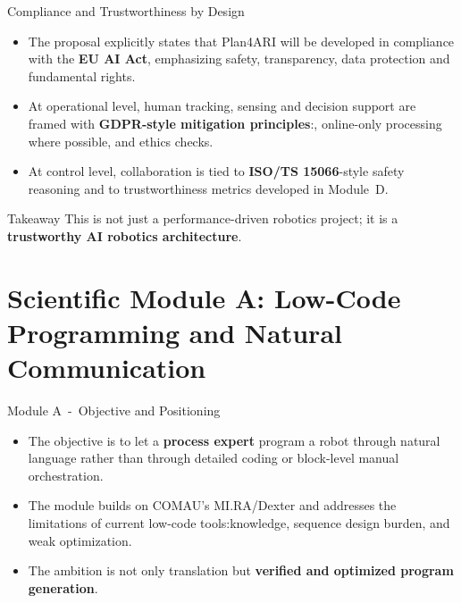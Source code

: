 \documentclass[aspectratio=169,10pt]{beamer}
\begin{document}
\begin{frame}{Compliance and Trustworthiness by Design}

\begin{itemize}
  \item The proposal explicitly states that Plan4ARI will be developed in compliance with the \textbf{EU AI Act}, emphasizing safety, transparency, data protection and fundamental rights.
  \item At operational level, human tracking, sensing and decision support are framed with \textbf{GDPR-style mitigation principles}:\@anonymization, online-only processing where possible, and ethics checks.
  \item At control level, collaboration is tied to \textbf{ISO/TS 15066}-style safety reasoning and to trustworthiness metrics developed in Module~D.
\end{itemize}
\begin{alertblock}{Takeaway}
This is not just a performance-driven robotics project; it is a \textbf{trustworthy AI robotics architecture}. 
\end{alertblock}

\end{frame}


\section{Scientific Module A: Low-Code Programming and Natural Communication}

\begin{frame}{Module A~-~Objective and Positioning}

\begin{itemize}
  \item The objective is to let a \textbf{process expert} program a robot through natural language rather than through detailed coding or block-level manual orchestration.
  \item The module builds on COMAU's MI.RA/Dexter and addresses the limitations of current low-code tools:\@library knowledge, sequence design burden, and weak optimization.
  \item The ambition is not only translation but \textbf{verified and optimized program generation}. 
\end{itemize}

\end{frame}
\end{document}
